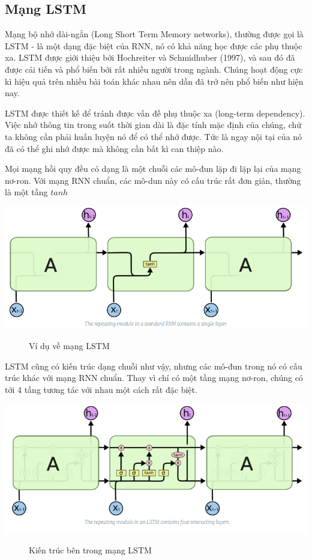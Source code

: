 \subsection{Mạng LSTM}
Mạng bộ nhớ dài-ngắn (Long Short Term Memory networks), thường được gọi là LSTM - là một dạng đặc biệt của RNN, nó có khả năng học được các phụ thuộc xa. LSTM được giới thiệu bởi Hochreiter và Schmidhuber (1997), và sau đó đã được cải tiến và phổ biến bởi rất nhiều người trong ngành. Chúng hoạt động cực kì hiệu quả trên nhiều bài toán khác nhau nên dần đã trở nên phổ biến như hiện nay.\par
LSTM được thiết kế để tránh được vấn đề phụ thuộc xa (long-term dependency). Việc nhớ thông tin trong suốt thời gian dài là đặc tính mặc định của chúng, chứ ta không cần phải huấn luyện nó để có thể nhớ được. Tức là ngay nội tại của nó đã có thể ghi nhớ được mà không cần bất kì can thiệp nào.\par
Mọi mạng hồi quy đều có dạng là một chuỗi các mô-đun lặp đi lặp lại của mạng nơ-ron. Với mạng RNN chuẩn, các mô-dun này có cấu trúc rất đơn giản, thường là một tầng $tanh$
\begin{center}
    \includegraphics[scale=.3]{image/chapter6/lstm1.png}
    \begin{figure}[htp]
    \begin{center}
    \end{center}
    \caption{Ví dụ về mạng LSTM}
    \end{figure}
\end{center}
LSTM cũng có kiến trúc dạng chuỗi như vậy, nhưng các mô-đun trong nó có cấu trúc khác với mạng RNN chuẩn. Thay vì chỉ có một tầng mạng nơ-ron, chúng có tới 4 tầng tương tác với nhau một cách rất đặc biệt.
\begin{center}
    \includegraphics[scale=.3]{image/chapter6/lstm2.png}
    \begin{figure}[htp]
    \begin{center}
     
    \end{center}
    \caption{Kiến trúc bên trong mạng LSTM}
    \end{figure}
\end{center}
